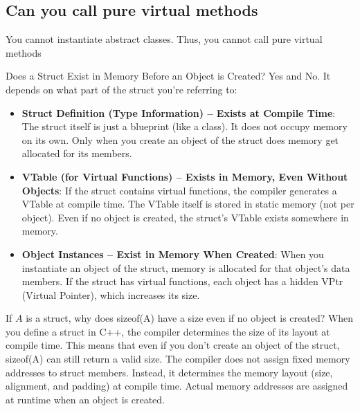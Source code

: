 \documentclass{report}
\begin{document}
    \bigbreak \noindent 
    \subsection{Can you call pure virtual methods}
    \bigbreak \noindent 
    You cannot instantiate abstract classes. Thus, you cannot call pure virtual methods






    \pagebreak 
    \bigbreak \noindent 
    Does a Struct Exist in Memory Before an Object is Created? Yes and No. It depends on what part of the struct you're referring to:
    \begin{itemize}
        \item \textbf{Struct Definition (Type Information) – Exists at Compile Time}: The struct itself is just a blueprint (like a class). It does not occupy memory on its own.
            \bigbreak \noindent 
            Only when you create an object of the struct does memory get allocated for its members.
        \item \textbf{VTable (for Virtual Functions) – Exists in Memory, Even Without Objects}: If the struct contains virtual functions, the compiler generates a VTable at compile time. The VTable itself is stored in static memory (not per object). Even if no object is created, the struct’s VTable exists somewhere in memory.
        \item \textbf{Object Instances – Exist in Memory When Created}: When you instantiate an object of the struct, memory is allocated for that object’s data members. If the struct has virtual functions, each object has a hidden VPtr (Virtual Pointer), which increases its size.
    \end{itemize}
    \bigbreak \noindent 
    If $A$ is a struct, why does sizeof(A) have a size even if no object is created? When you define a struct in C++, the compiler determines the size of its layout at compile time. This means that even if you don’t create an object of the struct, sizeof(A) can still return a valid size.
    \bigbreak \noindent 
    The compiler does not assign fixed memory addresses to struct members. Instead, it determines the memory layout (size, alignment, and padding) at compile time. Actual memory addresses are assigned at runtime when an object is created.
\end{document}
